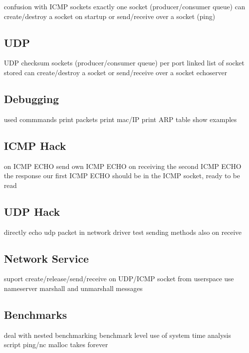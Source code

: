 confusion with ICMP sockets
exactly one socket (producer/consumer queue) 
can create/destroy a socket on startup or send/receive over a socket
(ping)

\subsection{UDP}

UDP checksum
sockets (producer/consumer queue) per port
linked list of socket stored
can create/destroy a socket or send/receive over a socket
echoserver

\subsection{Debugging}

used commmands
print packets
print mac/IP
print ARP table
show examples

\subsection{ICMP Hack}

on ICMP ECHO send own ICMP ECHO
on receiving the second ICMP ECHO the response our first ICMP ECHO should be in the ICMP socket, ready to be read

\subsection{UDP Hack}

directly echo udp packet in network driver
test sending methods also on receive

\subsection{Network Service}

suport create/release/send/receive on UDP/ICMP socket from userspace
use nameserver
marshall and unmarshall messages

\subsection{Benchmarks}

deal with nested benchmarking
benchmark level
use of system time
analysis script
ping/nc
malloc takes forever
